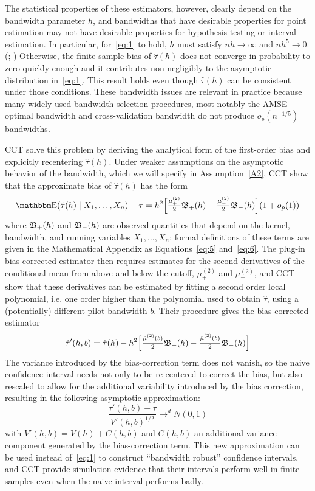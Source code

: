 \documentclass[12pt,fleqn]{article}
\begin{document}
The statistical properties of these estimators, however, clearly depend on the
bandwidth parameter $h$, and bandwidths that have desirable properties for point
estimation may not have desirable properties for hypothesis testing or interval
estimation. In particular, for~\eqref{eq:1} to hold, $h$ must satisfy
$n h \to \infty$ and $n h^5 \to 0$. (\citealp{HTV2001}; \citealp{Porter03})
Otherwise, the finite-sample bias of $\hat\tau(h)$ does not converge in
probability to zero quickly enough and it contributes non-negligibly to the
asymptotic distribution in~\eqref{eq:1}. This result holds even though
$\hat\tau(h)$ can be consistent under those conditions.  These bandwidth issues
are relevant in practice because many widely-used bandwidth selection
procedures, most notably the AMSE-optimal bandwidth and cross-validation
bandwidth \citep{IK} do not produce $o_{p}(n^{-1/5})$ bandwidths.

CCT solve this problem by deriving the analytical form of the first-order bias
and explicitly recentering $\hat\tau(h)$. Under weaker assumptions on the
asymptotic behavior of the bandwidth, which we will specify in
Assumption~\ref{A2}, CCT show that the approximate bias of $\hat\tau(h)$ has the
form
\begin{equation*}
  \E(\hat{\tau}(h) \mid X_1,\dots,X_n) - \tau =
  h^{2}\Big[ \tfrac{\mu_{+}^{(2)}}{2}\Bf_{+}(h)
  - \tfrac{\mu_{-}^{(2)}}{2}\Bf_{-}(h) \Big]
  (1+o_{p}(1))
\end{equation*}
where $\mathfrak{B}_{+}(h)$ and $\mathfrak{B}_{-}(h)$ are observed quantities that depend on the
kernel, bandwidth, and running variables $X_1,\dots,X_n$; formal definitions of
these terms are given in the Mathematical Appendix as Equations~\eqref{eq:5}
and~\eqref{eq:6}. The plug-in bias-corrected estimator then requires estimates
for the second derivatives of the conditional mean from above and below the
cutoff, $\mu_{+}^{(2)}$ and $\mu_{-}^{(2)}$, and CCT show that these derivatives
can be estimated by fitting a second order local polynomial, i.e. one order
higher than the polynomial used to obtain $\hat{\tau}$, using a (potentially)
different pilot bandwidth $b$. Their procedure gives the bias-corrected
estimator
\begin{gather*}
  \hat{\tau}'(h, b) = \hat{\tau}(h) - h^{2}
  \Big[\tfrac{\hat{\mu}_{+}^{(2)}(b)}{2} \mathfrak{B}_{+}(h)
  - \tfrac{\hat{\mu}_{-}^{(2)}(b)}{2}\mathfrak{B}_{-}(h) \Big]
\end{gather*}
The variance introduced by the bias-correction term does not vanish, so the
naive confidence interval needs not only to be re-centered to correct the bias,
but also rescaled to allow for the additional variability introduced by the bias
correction, resulting in the following asymptotic approximation:
\begin{equation*}
  \frac{\hat{\tau}'(h, b) - \tau}{V'(h, b)^{1/2}} \to^d N(0,1)
\end{equation*}
with $V'(h, b) = V(h) + C(h, b)$ and $C(h, b)$ an additional variance component
generated by the bias-correction term. This new approximation can be used
instead of~\eqref{eq:1} to construct ``bandwidth robust'' confidence intervals,
and CCT provide simulation evidence that their intervals perform well in finite
samples even when the naive interval performs badly.
\end{document}
